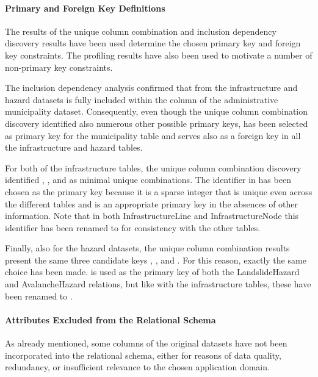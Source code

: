 \paragraph{Primary and Foreign Key Definitions}

The results of the unique column combination and inclusion dependency discovery results have been used determine the chosen primary key and foreign key constraints. The profiling results have also been used to motivate a number of non-primary key constraints.

The inclusion dependency analysis confirmed that  from the infrastructure and hazard datasets is fully included within the  column of the administrative municipality dataset. Consequently, even though the unique column combination discovery identified also numerous other possible primary keys,  has been selected as primary key for the municipality table and serves also as a foreign key in all the infrastructure and hazard tables.

For both of the infrastructure tables, the unique column combination discovery identified , , and  as minimal unique combinations. The identifier in  has been chosen as the primary key because it is a sparse integer that is unique even across the different tables and is an appropriate primary key in the absences of other information. Note that in both InfrastructureLine and InfrastructureNode this identifier has been renamed to  for consistency with the other tables.

Finally, also for the hazard datasets, the unique column combination results present the same three candidate keys , , and . For this reason, exactly the same choice has been made.  is used as the primary key of both the LandslideHazard and AvalancheHazard relations, but like with the infrastructure tables, these have been renamed to .


\paragraph{Attributes Excluded from the Relational Schema}

As already mentioned, some columns of the original datasets have not been incorporated into the relational schema, either for reasons of data quality, redundancy, or insufficient relevance to the chosen application domain.

